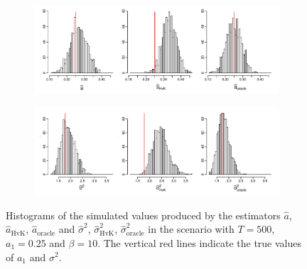 \begin{figure}[t!]
\centering
\begin{subfigure}[b]{\textwidth}
\includegraphics[width=\textwidth]{Plots/a_hat_histograms_a1=25_T=500_slope=10_(q,K1,K2,M1,M2)=(25,2,10,20,30).pdf}
\end{subfigure}
\begin{subfigure}[b]{\textwidth}
\includegraphics[width=\textwidth]{Plots/lrv_histograms_a1=25_T=500_slope=10_(q,K1,K2,M1,M2)=(25,2,10,20,30).pdf}
\end{subfigure}
\caption{Histograms of the simulated values produced by the estimators $\widehat{a}$, $\widehat{a}_{\text{HvK}}$, $\widehat{a}_{\text{oracle}}$ and $\widehat{\sigma}^2$, $\widehat{\sigma}^2_{\text{HvK}}$, $\widehat{\sigma}^2_{\text{oracle}}$ in the scenario with $T=500$, $a_1 = 0.25$ and $\beta = 10$. The vertical red lines indicate the true values of $a_1$ and $\sigma^2$.}\label{fig:hist_scenario2} 
\end{figure}


